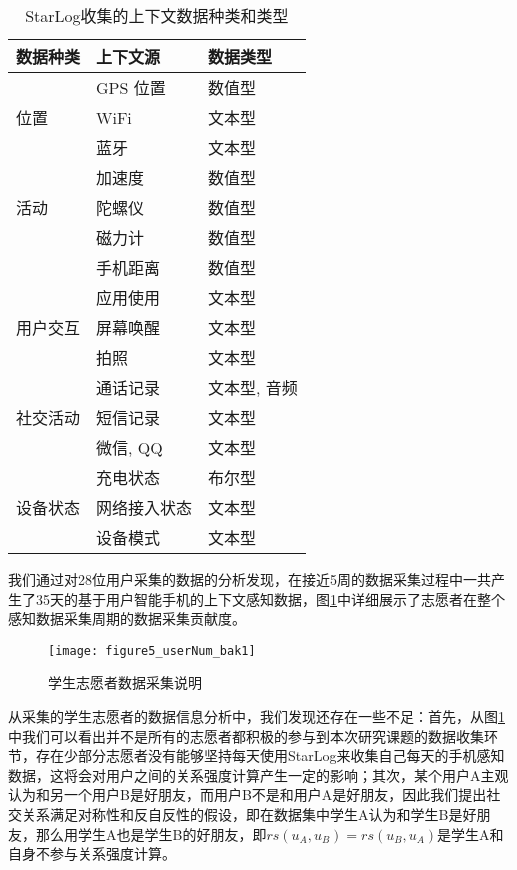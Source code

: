 \begin{center}
\begin{table}[H]
	\wuhao
	\renewcommand{\arraystretch}{1.3}
	\caption{StarLog收集的上下文数据种类和类型}
	\vspace{0.01cm}
	\label{tablesource}
	\centering
	\begin{tabular}{p{4cm} p{4cm} p{4cm}}
		\toprule[1.5pt]
		\textbf{数据种类} & \textbf{上下文源} & \textbf{数据类型} \\
		\hline
		& GPS 位置 & 数值型\\
		\cline{2-3}
		位置 & WiFi & 文本型\\
		\cline{2-3}
		& 蓝牙 & 文本型 \\
		\hline
		& 加速度 & 数值型\\
		\cline{2-3}
		活动 & 陀螺仪 & 数值型\\
		\cline{2-3}
		& 磁力计 & 数值型 \\
		\cline{2-3}
		& 手机距离 & 数值型 \\
		\hline
		& 应用使用 & 文本型\\
		\cline{2-3}
		用户交互 & 屏幕唤醒 & 文本型\\
		\cline{2-3}
		& 拍照 & 文本型 \\
		\hline
		& 通话记录 & 文本型, 音频\\
		\cline{2-3}
		社交活动 & 短信记录 & 文本型\\
		\cline{2-3}
		& 微信, QQ & 文本型 \\
		\hline
		& 充电状态 & 布尔型\\
		\cline{2-3}
		设备状态 & 网络接入状态 & 文本型\\
		\cline{2-3}
		& 设备模式 & 文本型 \\
		\bottomrule[1.5pt]
	\end{tabular}
\end{table}
\end{center}

\par 我们通过对28位用户采集的数据的分析发现，在接近5周的数据采集过程中一共产生了35天的基于用户智能手机的上下文感知数据，图\ref{fig:userNum}中详细展示了志愿者在整个感知数据采集周期的数据采集贡献度。
\begin{figure}[htb]
\centering
\texttt{[image: figure5\_userNum\_bak1]}
\caption{学生志愿者数据采集说明}
\label{fig:userNum}
\end{figure}
\par 从采集的学生志愿者的数据信息分析中，我们发现还存在一些不足：首先，从图\ref{fig:userNum}中我们可以看出并不是所有的志愿者都积极的参与到本次研究课题的数据收集环节，存在少部分志愿者没有能够坚持每天使用StarLog来收集自己每天的手机感知数据，这将会对用户之间的关系强度计算产生一定的影响；其次，某个用户A主观认为和另一个用户B是好朋友，而用户B不是和用户A是好朋友，因此我们提出社交关系满足对称性和反自反性的假设，即在数据集中学生A认为和学生B是好朋友，那么用学生A也是学生B的好朋友，即$rs(u_{A},u_{B})=rs(u_{B},u_{A})$是学生A和自身不参与关系强度计算。
